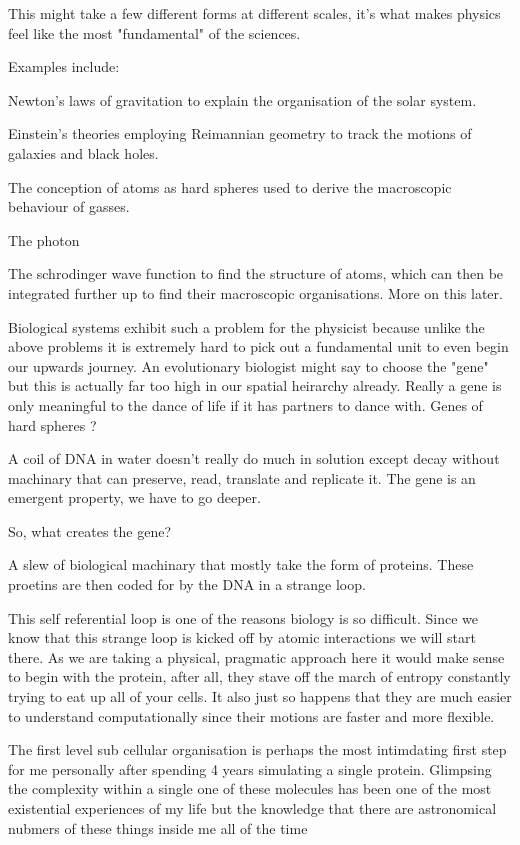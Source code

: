 This might take a few different forms at different scales, it's what makes physics feel like the most "fundamental" of the sciences. 

Examples include:

Newton's laws of gravitation to explain the organisation of the solar system. 

Einstein's theories employing Reimannian geometry to track the motions of galaxies and black holes.

The conception of atoms as hard spheres used to derive the macroscopic behaviour of gasses.

The photon  

The schrodinger wave function to find the structure of atoms, which can then be integrated further up to find their macroscopic organisations. More on this later.

Biological systems exhibit such a problem for the physicist because unlike the above problems it is extremely hard to pick out a fundamental unit to even begin our upwards journey. An evolutionary biologist might say to choose the "gene" but this is actually far too high in our spatial heirarchy already. Really a gene is only meaningful to the dance of life if it has partners to dance with. Genes of hard spheres ?

A coil of DNA in water doesn't really do much in solution except decay without machinary that can preserve, read, translate and replicate it. The gene is an emergent property, we have to go deeper. 

So, what creates the gene? 

A slew of biological machinary that mostly take the form of proteins. These proetins are then coded for by the DNA in a strange loop. 

This self referential loop is one of the reasons biology is so difficult. Since we know that this strange loop is kicked off by atomic interactions we will start there. As we are taking a physical, pragmatic approach here it would make sense to begin with the protein, after all, they stave off the march of entropy constantly trying to eat up all of your cells. It also just so happens that they are much easier to understand computationally since their motions are faster and more flexible. 

The first level sub cellular organisation is perhaps the most intimdating first step for me personally after spending 4 years simulating a single protein. Glimpsing the complexity within a single one of these molecules has been one of the most existential experiences of my life but the knowledge that there are astronomical nubmers of these things inside me all of the time 


